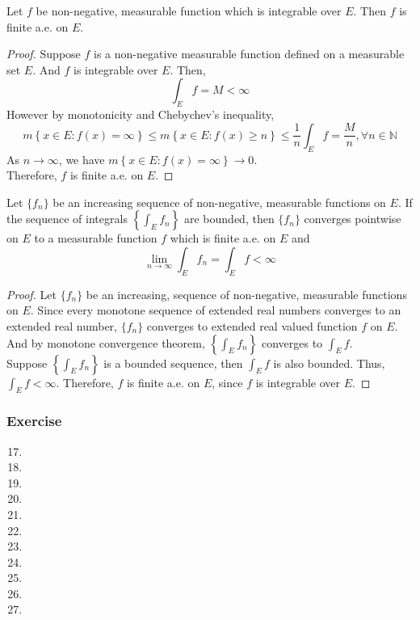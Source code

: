 \begin{theorem}
	Let $f$ be non-negative, measurable function which is integrable over $E$.
	Then $f$ is finite a.e. on $E$.
\end{theorem}
\begin{proof}
	Suppose $f$ is a non-negative measurable function defined on a measurable set $E$.
	And $f$ is integrable over $E$.
	Then,
	$$ \int_E f = M < \infty$$
	However by monotonicity and Chebychev's inequality,
	$$ m\left\{ x \in E : f(x) = \infty \right\} \le m\left\{ x \in E : f(x) \ge n \right\} \le \frac{1}{n} \int_E f = \frac{M}{n}, \forall n \in \mathbb{N} $$
	As $n \to \infty$, we have $m\left\{ x \in E : f(x) = \infty \right\} \to 0$.\\
	Therefore, $f$ is finite a.e. on $E$.
\end{proof}

\begin{theorem}
	Let $\{ f_n \}$ be an increasing sequence of non-negative, measurable functions on $E$.
	If the sequence of integrals $\displaystyle \left\{ \int_E f_n \right\}$ are bounded, then $\{ f_n \}$ converges pointwise on $E$ to a measurable function $f$ which is finite a.e. on $E$ and 
	$$ \lim_{n \to \infty} \int_E f_n = \int_E f < \infty $$
\end{theorem}
\begin{proof}
	Let $\{ f_n \}$ be an increasing, sequence of non-negative, measurable functions on $E$.
	Since every monotone sequence of extended real numbers converges to an extended real number, $\{ f_n \}$ converges to extended real valued function $f$ on $E$.
	And by monotone convergence theorem, $\left\{ \int_E f_n \right\}$ converges to $\displaystyle \int_E f$.\\

	Suppose $\displaystyle\left\{ \int_E f_n \right\}$ is a bounded sequence, then $\displaystyle \int_E f$ is also bounded.
	Thus, $\displaystyle \int_E f < \infty$.
	Therefore, $f$ is finite a.e. on $E$, since $f$ is integrable over $E$.
\end{proof}
\subsubsection{Exercise}
\begin{enumerate}
	\setcounter{enumi}{16}
	\item
	\item
	\item
	\item
	\item
	\item
	\item
	\item
	\item
	\item
	\item
\end{enumerate}
